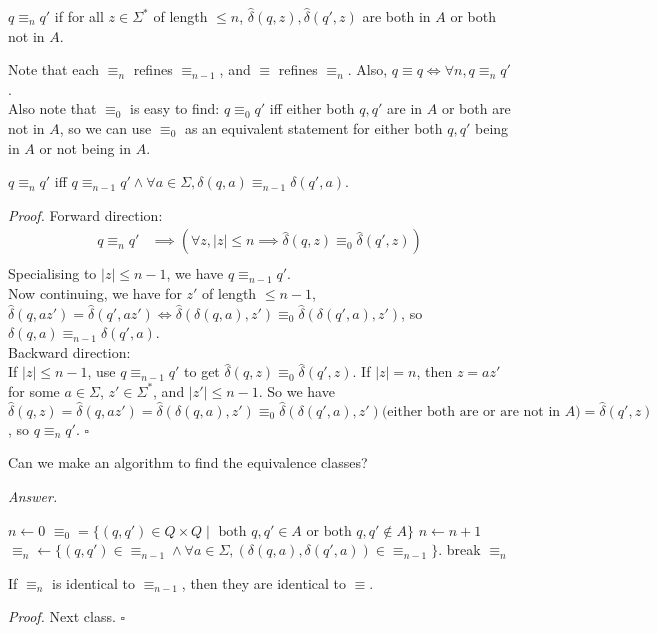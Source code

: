 \documentclass[a4paper]{article}
\newenvironment{proof}{\begin{breakbox}\textit{Proof.}}{\hfill$\square$\end{breakbox}}
\newenvironment{ans}{\begin{breakbox}\textit{Answer.}}{\end{breakbox}}
\newcommand{\nl}{\vspace{0.2cm}\\}
\newcommand{\hd}{\hat{\delta}}
\begin{document}
\begin{defn}
    $q \equiv_n q'$ if for all $z \in \Sigma^*$ of length $\le n$, $\hd(q, z), \hd(q', z)$ are both in $A$ or both not in $A$.
\end{defn}

\begin{note}
    Note that each $\equiv_n$ refines $\equiv_{n-1}$, and $\equiv$ refines $\equiv_n$. Also, $q \equiv q \iff \forall n, q \equiv_n q'$.\nl
    Also note that $\equiv_0$ is easy to find: $q \equiv_0 q'$ iff either both $q, q'$ are in $A$ or both are not in $A$, so we can use $\equiv_0$ as an equivalent statement for either both $q, q'$
    being in $A$ or not being in $A$.
\end{note}

\begin{claim}
    $q \equiv_n q'$ iff $q \equiv_{n-1} q' \land \forall a \in \Sigma, \delta(q, a) \equiv_{n-1} \delta(q', a)$.
\end{claim}

\begin{proof}
    Forward direction:\nl
    \begin{align*}    
        q \equiv_n q' &\implies (\forall z, |z| \le n \implies \hd(q, z) \equiv_0 \hd(q', z))\\
    \end{align*}
    Specialising to $|z| \le n - 1$, we have $q \equiv_{n-1} q'$.\nl
    Now continuing, we have for $z'$ of length $\le n - 1$, $\hd(q, az') = \hd(q', az') \iff \hd(\delta(q, a), z') \equiv_0 \hd(\delta(q', a), z')$, so $\delta(q, a) \equiv_{n-1} \delta(q',
        a)$.\nl
    Backward direction:\nl
    If $|z| \le n - 1$, use $q \equiv_{n-1} q'$ to get $\hd(q, z) \equiv_0 \hd(q', z)$.
    If $|z| = n$, then $z = az'$ for some $a \in \Sigma$, $z' \in \Sigma^*$, and $|z'| \le n - 1$. So we have $\hd(q, z) = \hd(q, az') = \hd(\delta(q, a), z') \equiv_0 \hd(\delta(q', a), z')
\text{(either both are or are not in $A$)} = \hd(q', z)$, so $q \equiv_n q'$.
\end{proof}

\begin{ques}
    Can we make an algorithm to find the equivalence classes?
\end{ques}

\begin{ans}
\begin{algorithmic}
        \State $n \gets 0$
        \State $\equiv_0 = \{(q, q') \in Q \times Q \mid \text{ both } q, q' \in A \text{ or both }q, q' \not\in A\}$
            \State $n \gets n + 1$
            \State $\equiv_n \gets \{(q, q') \in \equiv_{n-1} \land \forall a \in \Sigma, (\delta(q, a), \delta(q', a)) \in \equiv_{n-1}\}$.
                \State break
            \EndIf
        \EndWhile
        \State \Return $\equiv_n$
    \EndFunction
\end{algorithmic}
\end{ans}

\begin{claim}
    If $\equiv_n$ is identical to $\equiv_{n-1}$, then they are identical to $\equiv$.
\end{claim}

\begin{proof}
    Next class.
\end{proof}
\end{document}
